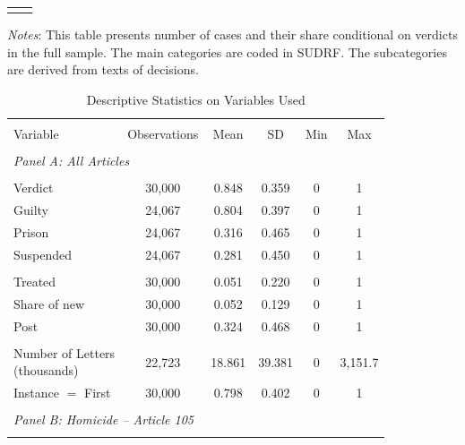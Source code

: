 \documentclass[12pt]{article}
\numberwithin{equation}{section}
\numberwithin{table}{section}
\numberwithin{figure}{section}
\begin{document}
\begin{table}[!htbp]
\begin{threeparttable}
\begin{tabular}{@{\extracolsep{3pt}}lc}
    \hline \\[-1.8ex] 
    \end{tabular}
    \begin{tablenotes}[flushleft]
        \item[] \textit{Notes}: This table presents number of cases and their share conditional on verdicts in the full sample. The main categories are coded in SUDRF. The subcategories are derived from texts of decisions.
    \end{tablenotes}
\end{threeparttable}
    \end{table}



\begin{table}[!htbp] \centering \footnotesize
    \begin{threeparttable}
    \caption{Descriptive Statistics on Variables Used} 
    \label{} 
  \begin{tabular}{@{\extracolsep{7pt}}lccccc} 
  \\[-1.8ex]\hline 
  \hline \\[-1.8ex] 
  Variable & \multicolumn{1}{c}{Observations} & \multicolumn{1}{c}{Mean} & \multicolumn{1}{c}{SD} & \multicolumn{1}{c}{Min} & \multicolumn{1}{c}{Max} \\ 
  \hline \\[-1.8ex] \multicolumn{5}{l}{\textit{Panel A: All Articles}} \\ \\[-1.8ex] 
  Verdict & 30,000 & 0.848 & 0.359 & 0 & 1 \\ 
  Guilty & 24,067 & 0.804 & 0.397 & 0 & 1 \\ 
  Prison & 24,067 & 0.316 & 0.465 & 0 & 1 \\ 
  Suspended & 24,067 & 0.281 & 0.450 & 0 & 1 \\  \\[-1.8ex] 
  Treated & 30,000 & 0.051 & 0.220 & 0 & 1 \\ 
    Share of new & 30,000 & 0.052 & 0.129 & 0 & 1 \\ 
    Post & 30,000 & 0.324 & 0.468 & 0 & 1 \\  \\[-1.8ex] 
  \makecell[l]{Number of Letters \\ \quad  (thousands)}&  22,723 & 18.861 & 39.381 & 0 & 3,151.7 \\ 
  Instance $=$ First & 30,000 & 0.798 & 0.402 & 0 & 1 \\ \\
  \multicolumn{5}{l}{\textit{Panel B: Homicide -- Article 105}} \\ \\[-1.8ex] 

\end{tabular}
\end{threeparttable}
\end{table}
\end{document}
